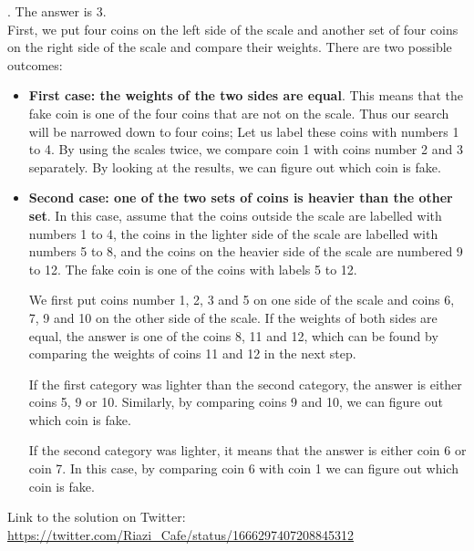 \begin{solution}.
The answer is 3.\\[0.2cm]

First, we put four coins on the left side of the scale and another set of four coins on the right side of the scale and compare their weights. There are two possible outcomes:

\begin{itemize}
\item \textbf{First case: the weights of the two sides are equal}. This means that the fake coin is one of the four coins that are not on the scale. Thus our search will be narrowed down to four coins; Let us label these coins with numbers 1 to 4. By using the scales twice, we compare coin 1 with coins number 2 and 3 separately. By looking at the results, we can figure out which coin is fake.

\item \textbf{Second case: one of the two sets of coins is heavier than the other set}. In this case, assume that the coins outside the scale are labelled with numbers 1 to 4, the coins in the lighter side of the scale are labelled with numbers 5 to 8, and the coins on the heavier side of the scale are numbered 9 to 12. The fake coin is one of the coins with labels 5 to 12.

We first put coins number 1, 2, 3 and 5 on one side of the scale and coins 6, 7, 9 and 10 on the other side of the scale. If the weights of both sides are equal, the answer is one of the coins 8, 11 and 12, which can be found by comparing the weights of coins 11 and 12 in the next step.

If the first category was lighter than the second category, the answer is either coins 5, 9 or 10. Similarly, by comparing coins 9 and 10, we can figure out which coin is fake.

If the second category was lighter, it means that the answer is either coin 6 or coin 7. In this case, by comparing coin 6 with coin 1 we can figure out which coin is fake.
\end{itemize}

Link to the solution on Twitter:  \url{https://twitter.com/Riazi_Cafe/status/1666297407208845312}\end{solution}